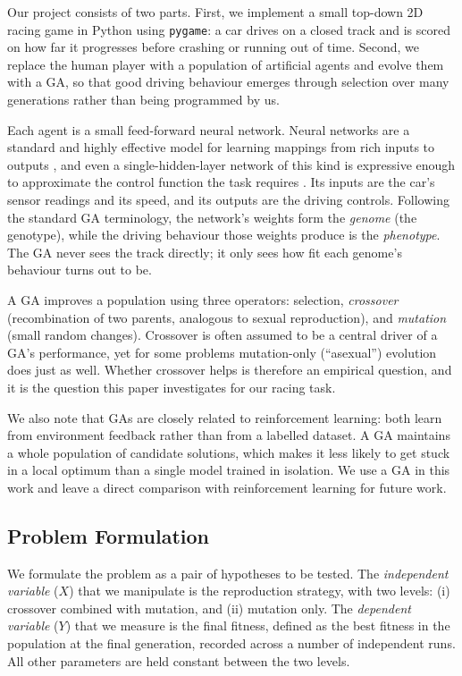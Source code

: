 \documentclass[a4paper, twocolumn]{article}
\begin{document}
Our project consists of two parts. First, we implement a small top-down 2D racing game in
Python using \texttt{pygame}:
a car drives on a closed track and is scored on how far it progresses before crashing or
running out of time.
Second, we replace the human player with a population of artificial agents and evolve them
with a GA, so that good driving behaviour emerges through selection over many generations
rather than being programmed by us.

Each agent is a small feed-forward neural network. Neural networks are a standard and highly
effective model for learning mappings from rich inputs to outputs \cite{lecun2015deep}, and
even a single-hidden-layer network of this kind is expressive enough to approximate the
control function the task requires \cite{leshno1993multilayer}. Its inputs are
the car's sensor readings and its speed, and its outputs are the driving controls.
Following the standard
GA terminology, the network's weights form the \emph{genome} (the genotype), while the driving
behaviour those weights produce is the \emph{phenotype}.
The GA never sees the track directly; it only sees how fit each genome's behaviour turns out to be.

A GA improves a population using three operators: 
selection, \emph{crossover} (recombination of two parents, analogous to sexual reproduction),
and \emph{mutation} (small random changes). 
Crossover is often assumed to be a central driver of a GA's performance, yet for some problems
mutation-only (``asexual'') evolution does just as well.
Whether crossover helps is therefore an empirical question, and it is the question this paper
investigates for our racing task.

We also note that GAs are closely related to reinforcement learning: both learn from
environment feedback rather than from a labelled dataset.
A GA maintains a whole population of
candidate solutions, which makes it less likely to get stuck in a local optimum than a single
model trained in isolation. We use a GA in this work and leave a direct comparison with
reinforcement learning for future work.


\subsection{Problem Formulation\label{sec:Problem Formulation}}

We formulate the problem as a pair of hypotheses to be tested.
The \emph{independent variable} ($X$) that we manipulate is the reproduction strategy,
with two levels:
(i) crossover combined with mutation, and (ii) mutation only.
The \emph{dependent variable} ($Y$) that we measure is the final fitness, defined as the best
fitness in the population at the final generation, recorded across a number of independent runs.
All other parameters are held constant between the two levels.
\end{document}
